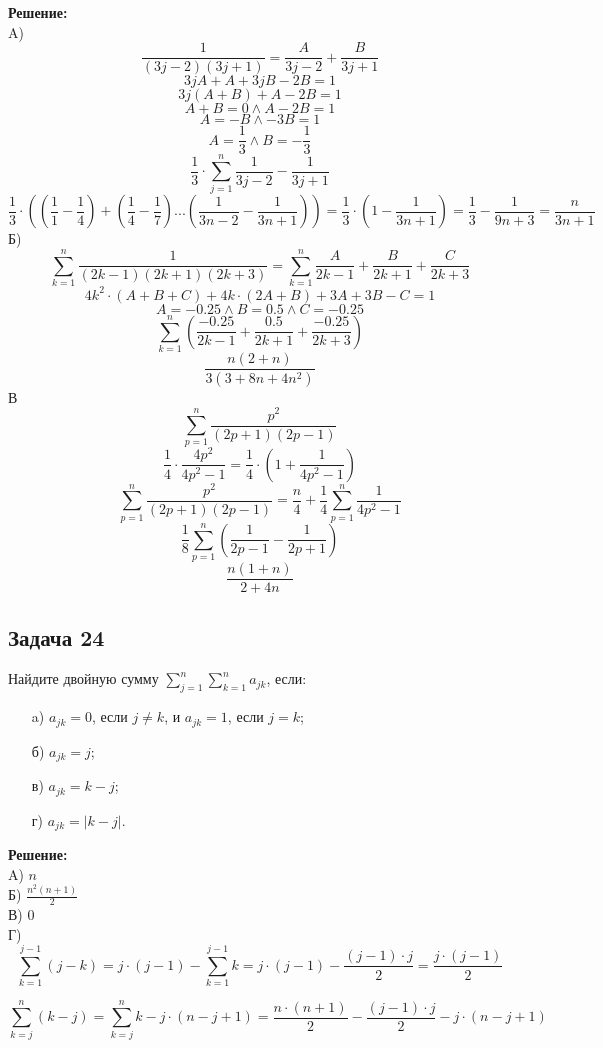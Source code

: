 \documentclass[a4paper,12pt]{article}
\begin{document}
\textbf{Решение:}\\
A)
\[
\frac{1}{(3j-2)(3j+1)}=\frac{A}{3j-2} + \frac{B}{3j+1}
\]
\[
3jA+A+3jB-2B=1
\]
\[
3j(A+B) + A-2B = 1
\]
\[
A+B = 0 \land A-2B=1
\]
\[
A=-B \land -3B=1
\]
\[
A=\frac{1}{3}\land B=-\frac{1}{3}
\]
\[
\frac{1}{3} \cdot \sum_{j=1}^{n} \frac{1}{3j-2} - \frac{1}{3j+1}
\]
\[
\frac{1}{3} \cdot ((\frac{1}{1} - \frac{1}{4})+(\frac{1}{4}-\frac{1}{7})...(\frac{1}{3n-2}-\frac{1}{3n+1}))=\frac{1}{3} \cdot (1-\frac{1}{3n+1})=\frac{1}{3} - \frac{1}{9n+3} = \frac{n}{3n+1}
\]
Б)
\[
\sum_{k=1}^{n} \frac{1}{(2k-1)(2k+1)(2k+3)} = \sum_{k=1}^{n}\frac{A}{2k-1} + \frac{B}{2k+1} + \frac{C}{2k+3}
\]
\[
4k^2\cdot (A+B+C) + 4k\cdot (2A + B) + 3A + 3B -C = 1
\]
\[
A=-0.25\land B=0.5 \land C=-0.25
\]
\[
\sum_{k=1}^{n} \left(\frac{-0.25}{2k-1} + \frac{0.5}{2k+1} + \frac{-0.25}{2k+3}\right)
\]
\[
\frac{n (2 + n)}{3 (3 + 8 n + 4 n^2)}
\]
В
\[
\sum_{p=1}^{n} \frac{p^2}{(2p+1)(2p-1)}
\]
\[
\frac{1}{4}\cdot \frac{4p^2}{4p^2 - 1} =\frac{1}{4}\cdot( 1 + \frac{1}{4p^2 - 1})
\]
\[
\sum_{p=1}^{n} \frac{p^2}{(2p+1)(2p-1)} = \frac{n}{4} + \frac{1}{4} \sum_{p=1}^{n} \frac{1}{4p^2 - 1}
\]
\[
\frac{1}{8} \sum_{p=1}^{n} \left( \frac{1}{2p-1} - \frac{1}{2p+1} \right)
\]
\[
\frac{n(1+n)}{2 + 4n}
\]
\vspace{1cm}

\subsection{Задача 24}
Найдите двойную сумму \(\sum_{j=1}^{n} \sum_{k=1}^{n} a_{jk}\), если:
\begin{itemize}
    \item[a)] \(a_{jk} = 0\), если \(j \neq k\), и \(a_{jk} = 1\), если \(j = k\);
    \item[б)] \(a_{jk} = j\);
    \item[в)] \(a_{jk} = k - j\);
    \item[г)] \(a_{jk} = |k - j|\).
\end{itemize}

\textbf{Решение:}\\
A) $n$\\
Б) $\frac{n^2(n+1)}{2}$\\
В) $0$\\
Г)
\[
\sum_{k=1}^{j-1} (j - k) = j \cdot (j-1) - \sum_{k=1}^{j-1} k = j \cdot (j-1) - \frac{(j-1) \cdot j}{2} = \frac{j \cdot (j-1)}{2}
\]

\[
\sum_{k=j}^{n} (k - j) = \sum_{k=j}^{n} k - j \cdot (n - j + 1) = \frac{n \cdot (n+1)}{2} - \frac{(j-1) \cdot j}{2} - j \cdot (n - j + 1)
\]
\end{document}
